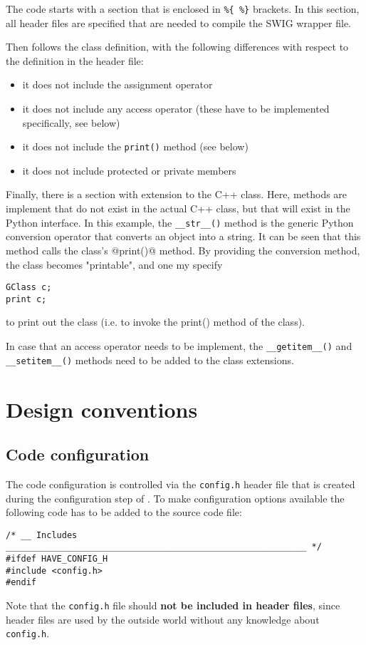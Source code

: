 \documentclass{article}[12pt,a4]
\begin{document}
The code starts with a section that is enclosed in {\tt \%\{  \%\}} brackets.
In this section, all header files are specified that are needed to compile the SWIG wrapper
file.

Then follows the class definition, with the following differences with respect to the
definition in the header file:
\begin{itemize}
\item it does not include the assignment operator
\item it does not include any access operator (these have to be implemented specifically, see below)
\item it does not include the {\tt print()} method (see below)
\item it does not include protected or private members
\end{itemize}

Finally, there is a section with extension to the C++ class.
Here, methods are implement that do not exist in the actual C++ class, but that will
exist in the Python interface.
In this example, the {\tt\_\_str\_\_()} method is the generic Python conversion operator that
converts an object into a string.
It can be seen that this method calls the class's @print()@ method.
By providing the conversion method, the class becomes "printable", and one
my specify
\begin{verbatim}
GClass c;
print c;
\end{verbatim}
to print out the class (i.e. to invoke the print() method of the class).

In case that an access operator needs to be implement, the {\tt\_\_getitem\_\_()} and {\tt\_\_setitem\_\_()}
methods need to be added to the class extensions.


\section{Design conventions}

\subsection{Code configuration}
\label{sec:configure}

The code configuration is controlled via the {\tt config.h} header file that is created during the
configuration step of \this.
To make configuration options available the following code has to be added to the
source code file:
\begin{verbatim}
/* __ Includes ___________________________________________________________ */
#ifdef HAVE_CONFIG_H
#include <config.h>
#endif
\end{verbatim}
Note that the {\tt config.h} file should {\bf not be included in header files}, since header files
are used by the outside world without any knowledge about {\tt config.h}.
\end{document}
